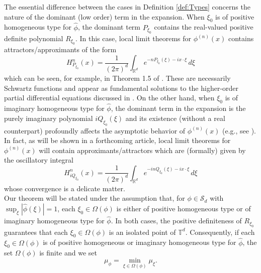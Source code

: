 \documentclass[11pt, letter]{book}
\begin{document}
\noindent The essential difference between the cases in Definition \ref{def:Types} 
concerns the nature of the dominant (low order) term in the expansion. When $\xi_0$ is of positive homogeneous type for $\widehat{\phi}$, the dominant term $P_{\xi_0}$ contains the real-valued positive definite polynomial $R_{\xi_0}$. In this case, local limit theorems for $\phi^{(n)}(x)$ contains attractors/approximants of the form
\begin{equation*}
    H^n_{P_{\xi_0}}(x)=\frac{1}{(2\pi)^d}\int_{\mathbb{R}^d}e^{-nP_{\xi_0}(\xi)-ix\cdot\xi}\,d\xi
\end{equation*}
which can be seen, for example, in Theorem 1.5 of \cite{randles_convolution_2017}. These are necessarily Schwartz functions and appear as fundamental solutions to the higher-order partial differential equations discussed in \cite{randles_positive-homogeneous_2017}. On the other hand, when $\xi_0$ is of imaginary homogeneous type for $\widehat{\phi}$, the dominant term in the expansion is the purely imaginary polynomial $iQ_{\xi_0}(\xi)$ and its existence (without a real counterpart) profoundly affects the asymptotic behavior of $\phi^{(n)}(x)$ (e.g., see \cite{randles_convolution_2015}). In fact, as will be shown in a forthcoming article, local limit theorems for $\phi^{(n)}(x)$ will contain approximants/attractors which are (formally) given by the oscillatory integral
\begin{equation*}
    H_{iQ_{\xi_0}}^{n}(x)=\frac{1}{(2\pi)^d}\int_{\mathbb{R}^d}e^{-inQ_{\xi_0}(\xi)-ix\cdot \xi}\,d\xi
\end{equation*}
whose convergence is a delicate matter.\\






\noindent Our theorem will be stated under the assumption that, for $\phi\in\mathcal{S}_d$ with $\sup_\xi|\widehat{\phi}(\xi)|=1$, each $\xi_0\in\Omega(\phi)$ is either of positive homogeneous type or of imaginary homogeneous type for $\widehat{\phi}$. In both cases, the positive definiteness of $R_{\xi_0}$ guarantees that each $\xi_0\in\Omega(\phi)$ is an isolated point of $\mathbb{T}^d$. Consequently, if each $\xi_0\in\Omega(\phi)$ is of positive homogeneous or imaginary homogeneous type for $\widehat{\phi}$, the set $\Omega(\phi)$ is finite and we set
\begin{equation*}
    \mu_{\phi}=\min_{\xi\in\Omega(\phi)}\mu_{\xi}.
\end{equation*}
\end{document}
